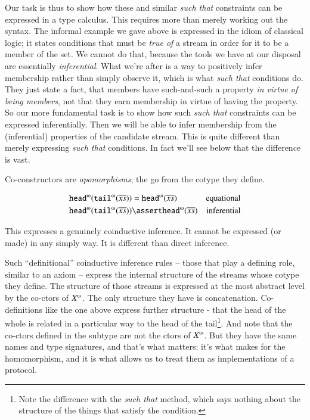 Our task is thus to show how these and similar \textit{such that}
constraints can be expressed in a type calculus. This requires more
than merely working out the syntax. The informal example we gave above
is expressed in the idiom of classical logic; it states conditions
that must be \textit{true of} a stream in order for it to be a member
of the set. We cannot do that, because the tools we have at our
disposal are essentially \textit{inferential}. What we're after is a
way to positively infer membership rather than simply observe it,
which is what \textit{such that} conditions do. They just state a
fact, that members have such-and-such a property \textit{in virtue of
  being members}, not that they earn membership in virtue of having
the property. So our more fundamental task is to show how such
\textit{such that} constraints can be expressed inferentially. Then we
will be able to infer membership from the (inferential) properties of
the candidate stream. This is quite different than merely expressing
\textit{such that} conditions. In fact we'll see below that the
difference is vast.

Co-constructors are \textit{apomorphisms}; the go from the cotype they
define.

\begin{align}
 \cohead(\cotail(\coseq{x})) & = \cohead(\coseq{x}) & \text{equational} \\
  \cohead(\cotail(\coseq{x})) & \linfer \cohead(\coseq{x}) & \text{inferential}
\end{align}

This expresses a genuinely coinductive inference. It cannot be
expressed (or made) in any simply way. It is different than direct
inference.

Such ``definitional'' coinductive inference rules -- those that play a
defining role, similar to an axiom -- express the internal structure
of the streams whose cotype they define. The structure of those
streams is expressed at the most abstract level by the co-ctors of
\(\colist{X}\). The only structure they have is concatenation.
Co-definitions like the one above express further structure - that the
head of the whole is related in a particular way to the head of the
tail\footnote{Note the difference with the \textit{such that} method,
which says nothing about the structure of the things that satisfy the
condition.}. And note that the co-ctors defined in the subtype are not
the ctors of \(\colist{X}\). But they have the same names and type
signatures, and that's what matters: it's what makes for the
homomorphism, and it is what allows us to treat them as
implementations of a protocol.

